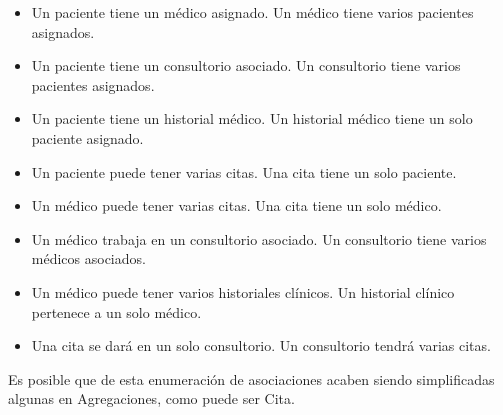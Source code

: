\begin{itemize}
  \item Un paciente tiene un médico asignado. Un médico tiene varios pacientes asignados.
  \item Un paciente tiene un consultorio asociado. Un consultorio tiene varios pacientes asignados.
  \item Un paciente tiene un historial médico. Un historial médico tiene un solo paciente asignado.
  \item Un paciente puede tener varias citas. Una cita tiene un solo paciente. 
  \item Un médico puede tener varias citas. Una cita tiene un solo médico.
  \item Un médico trabaja en un consultorio asociado. Un consultorio tiene varios médicos asociados.
  \item Un médico puede tener varios historiales clínicos. Un historial clínico pertenece a un solo médico.
  \item Una cita se dará en un solo consultorio. Un consultorio tendrá varias citas. 
\end{itemize}

Es posible que de esta enumeración de asociaciones acaben siendo simplificadas algunas en Agregaciones, como puede ser Cita. 